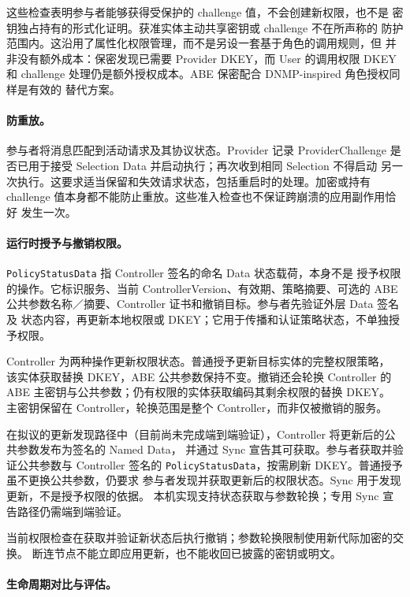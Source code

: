 这些检查表明参与者能够获得受保护的 challenge 值，不会创建新权限，也不是
密钥独占持有的形式化证明。获准实体主动共享密钥或 challenge 不在所声称的
防护范围内。这沿用了属性化权限管理，而不是另设一套基于角色的调用规则，但
并非没有额外成本：保密发现已需要 Provider DKEY，而 User 的调用权限 DKEY
和 challenge 处理仍是额外授权成本。ABE 保密配合 DNMP-inspired 角色授权同样是有效的
替代方案。

\paragraph{防重放。}
参与者将消息匹配到活动请求及其协议状态。Provider 记录 ProviderChallenge
是否已用于接受 Selection Data 并启动执行；再次收到相同 Selection 不得启动
另一次执行。这要求适当保留和失效请求状态，包括重启时的处理。加密或持有
challenge 值本身都不能防止重放。这些准入检查也不保证跨崩溃的应用副作用恰好
发生一次。

\paragraph{运行时授予与撤销权限。}

\texttt{PolicyStatusData} 指 Controller 签名的命名 Data 状态载荷，本身不是
授予权限的操作。它标识服务、当前 ControllerVersion、有效期、策略摘要、可选的
ABE 公共参数名称／摘要、Controller 证书和撤销目标。参与者先验证外层 Data 签名及
状态内容，再更新本地权限或 DKEY；它用于传播和认证策略状态，不单独授予权限。

Controller 为两种操作更新权限状态。普通授予更新目标实体的完整权限策略，
该实体获取替换 DKEY，ABE 公共参数保持不变。撤销还会轮换 Controller 的
ABE 主密钥与公共参数；仍有权限的实体获取编码其剩余权限的替换 DKEY。
主密钥保留在 Controller，轮换范围是整个 Controller，而非仅被撤销的服务。

在拟议的更新发现路径中（目前尚未完成端到端验证），Controller 将更新后的公共参数发布为签名的 Named Data，
并通过 Sync 宣告其可获取。参与者获取并验证公共参数与 Controller 签名的
\texttt{PolicyStatusData}，按需刷新 DKEY。普通授予虽不更换公共参数，仍要求
参与者发现并获取更新后的权限状态。Sync 用于发现更新，不是授予权限的依据。
本机实现支持状态获取与参数轮换；专用 Sync 宣告路径仍需端到端验证。

当前权限检查在获取并验证新状态后执行撤销；参数轮换限制使用新代际加密的交换。
断连节点不能立即应用更新，也不能收回已披露的密钥或明文。

\paragraph{生命周期对比与评估。}

